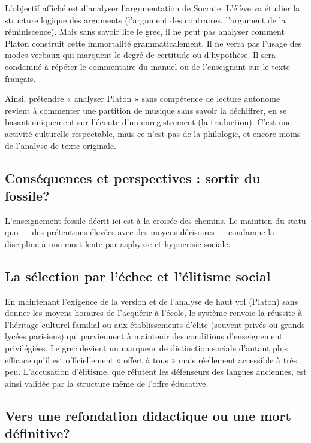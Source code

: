 L'objectif affiché est d'analyser l'argumentation de Socrate. L'élève va étudier la structure
logique des arguments (l'argument des contraires, l'argument de la réminiscence). Mais sans savoir
lire le grec, il ne peut pas analyser comment Platon construit cette immortalité grammaticalement.
Il ne verra pas l'usage des modes verbaux qui marquent le degré de certitude ou d'hypothèse. Il sera
condamné à répéter le commentaire du manuel ou de l'enseignant sur le texte français.

Ainsi, prétendre « analyser Platon » sans compétence de lecture autonome revient à commenter une
partition de musique sans savoir la déchiffrer, en se basant uniquement sur l'écoute d'un
enregistrement (la traduction). C'est une activité culturelle respectable, mais ce n'est pas de la
philologie, et encore moins de l'analyse de texte originale.



\subsection{Conséquences et perspectives : sortir du fossile?}

L'enseignement fossile décrit ici est à la croisée des chemins. Le maintien du statu quo — des
prétentions élevées avec des moyens dérisoires — condamne la discipline à une mort lente par
asphyxie et hypocrisie sociale.



\subsection{La sélection par l'échec et l'élitisme social}

En maintenant l'exigence de la version et de l'analyse de haut vol (Platon) sans donner les moyens
horaires de l'acquérir à l'école, le système renvoie la réussite à l'héritage culturel familial ou
aux établissements d'élite (souvent privés ou grands lycées parisiens) qui parviennent à maintenir
des conditions d'enseignement privilégiées. Le grec devient un marqueur de distinction sociale
d'autant plus efficace qu'il est officiellement « offert à tous » mais réellement accessible à très
peu. L'accusation d'élitisme, que réfutent les défenseurs des langues anciennes, est ainsi validée
par la structure même de l'offre éducative.\cite{I-3-3-ref3}



\subsection{Vers une refondation didactique ou une mort définitive?}

